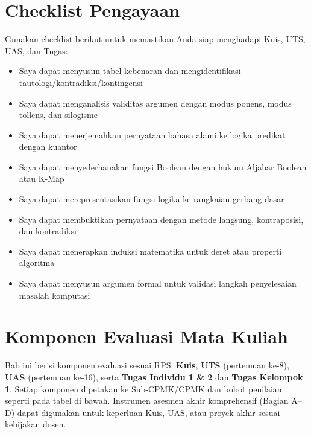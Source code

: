 \documentclass[../main]{subfiles}
\begin{document}
\section*{Checklist Pengayaan}

Gunakan checklist berikut untuk memastikan Anda siap menghadapi Kuis, UTS, UAS, dan Tugas:
\begin{itemize}[label=$\square$]
  \item Saya dapat menyusun tabel kebenaran dan mengidentifikasi tautologi/kontradiksi/kontingensi
  \item Saya dapat menganalisis validitas argumen dengan modus ponens, modus tollens, dan silogisme
  \item Saya dapat menerjemahkan pernyataan bahasa alami ke logika predikat dengan kuantor
  \item Saya dapat menyederhanakan fungsi Boolean dengan hukum Aljabar Boolean atau K-Map
  \item Saya dapat merepresentasikan fungsi logika ke rangkaian gerbang dasar
  \item Saya dapat membuktikan pernyataan dengan metode langsung, kontraposisi, dan kontradiksi
  \item Saya dapat menerapkan induksi matematika untuk deret atau properti algoritma
  \item Saya dapat menyusun argumen formal untuk validasi langkah penyelesaian masalah komputasi
\end{itemize}


\section{Komponen Evaluasi Mata Kuliah}

Bab ini berisi komponen evaluasi sesuai RPS: \textbf{Kuis}, \textbf{UTS} (pertemuan ke-8), \textbf{UAS} (pertemuan ke-16), serta \textbf{Tugas Individu 1 \& 2} dan \textbf{Tugas Kelompok 1}. Setiap komponen dipetakan ke Sub-CPMK/CPMK dan bobot penilaian seperti pada tabel di bawah. Instrumen asesmen akhir komprehensif (Bagian A--D) dapat digunakan untuk keperluan Kuis, UAS, atau proyek akhir sesuai kebijakan dosen.
\end{document}

